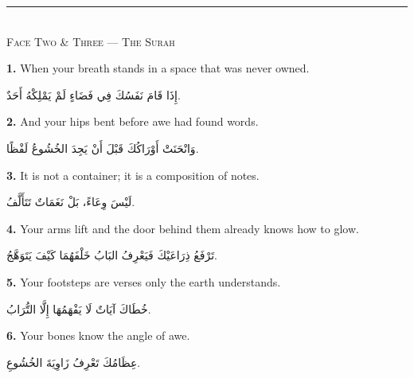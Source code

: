 \documentclass[11pt,a4paper,twoside]{book}
\begin{document}
\vspace{2em}
\begin{center}
\rule{3cm}{0.4pt}\\[1em]
{\small\scshape Face Two \& Three — The Surah}
\end{center}
\vspace{1em}

{\color{indigo}\bfseries 1.}\quad
When your breath stands in a space that was never owned.

\begin{flushright}
{\arabicfont
إِذَا قَامَ نَفَسُكَ فِي فَضَاءٍ لَمْ يَمْلِكْهُ أَحَدٌ.}
\end{flushright}

\vspace{1em}
{\color{indigo}\bfseries 2.}\quad
And your hips bent before awe had found words.

\begin{flushright}
{\arabicfont
وَانْحَنَتْ أَوْرَاكُكَ قَبْلَ أَنْ يَجِدَ الخُشُوعُ لَفْظًا.}
\end{flushright}

\vspace{1em}
{\color{indigo}\bfseries 3.}\quad
It is not a container; it is a composition of notes.

\begin{flushright}
{\arabicfont
لَيْسَ وِعَاءً، بَلْ نَغَمَاتٌ تَتَأَلَّفُ.}
\end{flushright}

\vspace{1em}
{\color{indigo}\bfseries 4.}\quad
Your arms lift and the door behind them already knows how to glow.

\begin{flushright}
{\arabicfont
تَرْفَعُ ذِرَاعَيْكَ فَيَعْرِفُ البَابُ خَلْفَهُمَا كَيْفَ يَتَوَهَّجُ.}
\end{flushright}

\vspace{1em}
{\color{indigo}\bfseries 5.}\quad
Your footsteps are verses only the earth understands.

\begin{flushright}
{\arabicfont
خُطَاكَ آيَاتٌ لَا يَفْهَمُهَا إِلَّا التُّرَابُ.}
\end{flushright}

\vspace{1em}
{\color{indigo}\bfseries 6.}\quad
Your bones know the angle of awe.

\begin{flushright}
{\arabicfont
عِظَامُكَ تَعْرِفُ زَاوِيَةَ الخُشُوعِ.}
\end{flushright}
\end{document}
